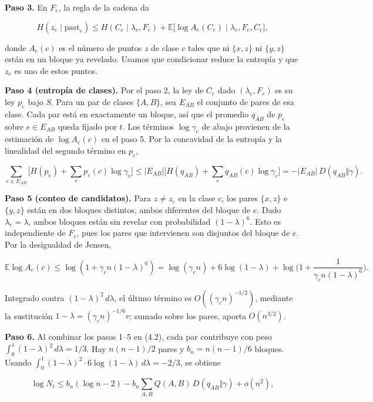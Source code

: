 \documentclass[spanish,11pt,a4paper]{article}
\begin{document}
\textbf{Paso 3.} En \(F_e\), la regla de la cadena da

\nopagebreak[4]
\[H(z_e\mid\mathrm{past}_e)\le H(C_e\mid\lambda_e,F_e)+\mathbb E\big[\log A_e(C_e)\mid\lambda_e,F_e,C_e\big],\]

donde \(A_e(c)\) es el número de puntos \(z\) de clase \(c\) tales que ni \(\{x,z\}\) ni \(\{y,z\}\) están en un bloque ya revelado. Usamos que condicionar reduce la entropía y que \(z_e\) es uno de estos puntos.

\textbf{Paso 4 (entropía de clases).} Por el paso 2, la ley de \(C_e\) dado \((\lambda_e,F_e)\) es su ley \(p_e\) bajo \(S\). Para un par de clases \(\{A,B\}\), sea \(E_{AB}\) el conjunto de pares de esa clase. Cada par está en exactamente un bloque, así que el promedio \(q_{AB}\) de \(p_e\) sobre \(e\in E_{AB}\) queda fijado por \(t\). Los términos \(\log\gamma_c\) de abajo provienen de la estimación de \(\log A_e(c)\) en el paso 5. Por la concavidad de la entropía y la linealidad del segundo término en \(p_e\),

\nopagebreak[4]
\[\sum_{e\in E_{AB}}\Big[H(p_e)+\sum_c p_e(c)\log\gamma_c\Big]\le|E_{AB}|\Big[H(q_{AB})+\sum_c q_{AB}(c)\log\gamma_c\Big]=-|E_{AB}|\,D(q_{AB}\Vert\gamma).\]

\textbf{Paso 5 (conteo de candidatos).} Para \(z\ne z_e\) en la clase \(c\), los pares \(\{x,z\}\) e \(\{y,z\}\) están en dos bloques distintos, ambos diferentes del bloque de \(e\). Dado \(\lambda_e=\lambda\), ambos bloques están sin revelar con probabilidad \((1-\lambda)^6\). Esto es independiente de \(F_e\), pues los pares que intervienen son disjuntos del bloque de \(e\). Por la desigualdad de Jensen,

\nopagebreak[4]
\[\mathbb E\log A_e(c)\le\log(1+\gamma_c n(1-\lambda)^6)=\log(\gamma_c n)+6\log(1-\lambda)+\log\Big(1+\frac{1}{\gamma_c n(1-\lambda)^6}\Big).\]

Integrado contra \((1-\lambda)^2\,d\lambda\), el último término es \(O((\gamma_c n)^{-1/2})\), mediante la sustitución \(1-\lambda=(\gamma_c n)^{-1/6}v\); sumado sobre los pares, aporta \(O(n^{3/2})\).

\textbf{Paso 6.} Al combinar los pasos 1--5 en (4.2), cada par contribuye con peso \(\int_0^1(1-\lambda)^2\,d\lambda=1/3\). Hay \(n(n-1)/2\) pares y \(b_n=n(n-1)/6\) bloques. Usando \(\int_0^1(1-\lambda)^2\cdot6\log(1-\lambda)\,d\lambda=-2/3\), se obtiene

\nopagebreak[4]
\[\log N_t\le b_n(\log n-2)-b_n\sum_{A,B}Q(A,B)\,D(q_{AB}\Vert\gamma)+o(n^2),\]
\end{document}
